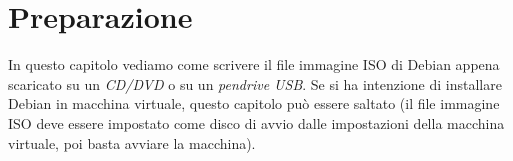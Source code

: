 \chapter{Preparazione}
In questo capitolo vediamo come scrivere il file immagine ISO di Debian appena scaricato su un \textit{CD/DVD} o su un \textit{pendrive USB}. Se si ha intenzione di installare Debian in macchina virtuale, questo capitolo può essere saltato (il file immagine ISO deve essere impostato come disco di avvio dalle impostazioni della macchina virtuale, poi basta avviare la macchina).





